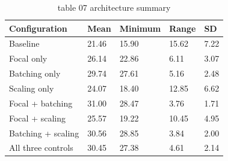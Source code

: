 \begin{table}[t]
\centering
\caption{table 07 architecture summary}
\label{tab:architecture_summary}
\begin{tabular}{lllll}
\hline
Configuration & Mean & Minimum & Range & SD \\
\hline
Baseline & 21.46 & 15.90 & 15.62 & 7.22 \\
Focal only & 26.14 & 22.86 & 6.11 & 3.07 \\
Batching only & 29.74 & 27.61 & 5.16 & 2.48 \\
Scaling only & 24.07 & 18.40 & 12.85 & 6.62 \\
Focal + batching & 31.00 & 28.47 & 3.76 & 1.71 \\
Focal + scaling & 25.57 & 19.22 & 10.45 & 4.95 \\
Batching + scaling & 30.56 & 28.85 & 3.84 & 2.00 \\
All three controls & 30.45 & 27.38 & 4.61 & 2.14 \\
\hline
\end{tabular}
\end{table}
